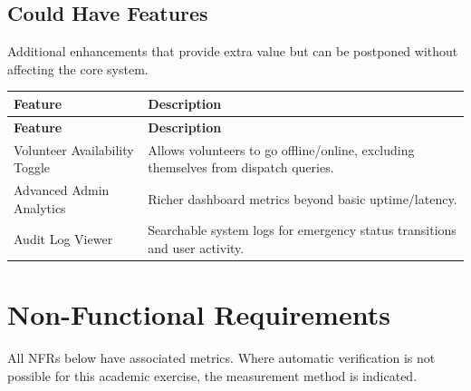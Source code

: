 \documentclass[12pt,a4paper]{article}
\begin{document}
\subsection{Could Have Features}
Additional enhancements that provide extra value but can be postponed without affecting the core system.

\begin{longtable}{|p{4cm}|p{9cm}|}
\hline
\rowcolor{lightorange}
\textbf{Feature} & \textbf{Description} \\
\hline
\endfirsthead
\hline
\rowcolor{lightorange}
\textbf{Feature} & \textbf{Description} \\
\hline
\endhead

Volunteer Availability Toggle &
Allows volunteers to go offline/online, excluding themselves from dispatch queries. \\
\hline

Advanced Admin Analytics &
Richer dashboard metrics beyond basic uptime/latency. \\
\hline

Audit Log Viewer &
Searchable system logs for emergency status transitions and user activity. \\
\hline

\end{longtable}

\section{Non-Functional Requirements}

All NFRs below have associated metrics. Where automatic verification is not possible for this academic exercise, the measurement method is indicated.
\end{document}
